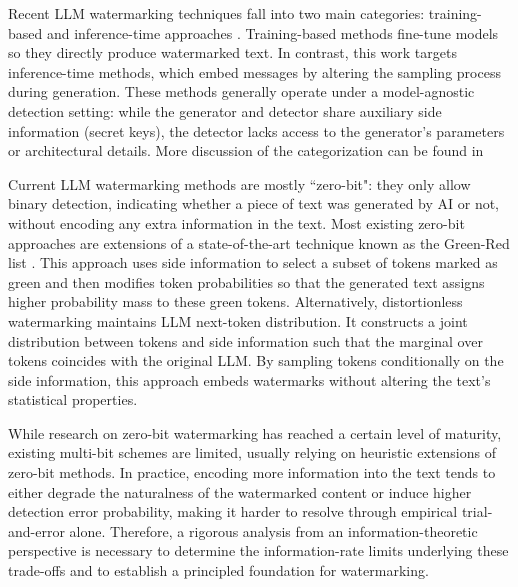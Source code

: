 \documentclass[11pt,letterpaper]{article}
\begin{document}
Recent LLM watermarking techniques fall into two main categories: training-based \cite{sun2023codemark,xu2024learning,gu2023learnability,padhi2024deep,liu2023unforgeable,munyer2024deeptextmark,an2026reinforcement} and inference-time approaches \cite{aaronson2023watermarking, he2024theoretically,hedistributional,kirchenbauer2023watermark,kuditipudi2023robust,zhao2023provable,liu2024adaptive,hu2023unbiased,wu2023resilient,chao2024watermarking, dathathri2024scalable,long2025optimized,zhu2024duwak,takezawa2023necessary,chen2025improved,christ2024undetectable,wouters2023optimizing,kirchenbauer2023reliability}. Training-based methods fine-tune models so they directly produce watermarked text. In contrast, this work targets inference-time methods, which embed messages by altering the sampling process during generation. These methods generally operate under a model-agnostic detection setting: while the generator and detector share auxiliary side information (secret keys), the detector lacks access to the generator’s parameters or architectural details. More discussion of the categorization can be found in \cite{liu2024survey, yang2025watermarking}

Current LLM watermarking methods are mostly ``zero-bit": they only allow binary detection, indicating whether a piece of text was generated by AI or not, without encoding any extra information in the text. Most existing zero-bit approaches \cite{takezawa2023necessary,zhu2024duwak,hu2023unbiased,chen2025improved,wouters2023optimizing,kirchenbauer2023reliability} are extensions of a state-of-the-art technique known as the Green-Red list \cite{kirchenbauer2023watermark}. This approach uses side information to select a subset of tokens marked as green and then modifies token probabilities so that the generated text assigns higher probability mass to these green tokens. Alternatively, distortionless watermarking \cite{kuditipudi2023robust, hu2023unbiased,wu2023resilient,chao2024watermarking,long2025optimized,chen2025improved,christ2024undetectable,wouters2023optimizing} maintains LLM next-token distribution. It constructs a joint distribution between tokens and side information such that the marginal over tokens coincides with the original LLM. By sampling tokens conditionally on the side information, this approach embeds watermarks without altering the text's statistical properties. 

While research on zero-bit watermarking has reached a certain level of maturity, existing multi-bit schemes \cite{jiang2025stealthink,wang2023towards,yoo2024advancing,boroujeny2024multi} are limited, usually relying on heuristic extensions of zero-bit methods. In practice, encoding more information into the text tends to either degrade the naturalness of the watermarked content or induce higher detection error probability, making it harder to resolve through empirical trial-and-error alone. Therefore, a rigorous analysis from an information-theoretic perspective \cite{moulin2000information,moulin2001role,cohen2002gaussian,merhav2002random,steinberg2002identification} is necessary to determine the information-rate limits underlying these trade-offs and to establish a principled foundation for watermarking.
\end{document}
